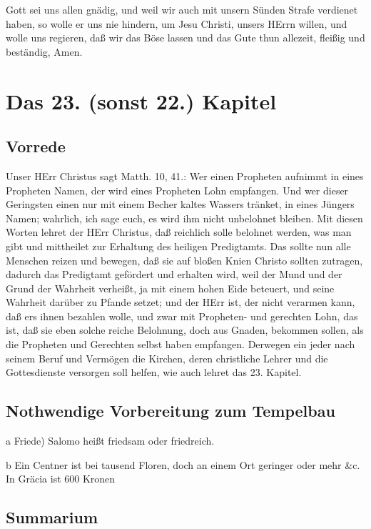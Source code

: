 Gott sei uns allen gnädig, und weil wir auch mit unsern Sünden Strafe verdienet haben, so wolle er uns nie hindern, um Jesu Christi, unsers HErrn willen, und wolle uns regieren, daß wir das Böse lassen und das Gute thun allezeit, fleißig und beständig, Amen.

\chapter{Das 23. (sonst 22.) Kapitel}

\section{Vorrede}

Unser HErr Christus sagt Matth. 10, 41.: Wer einen Propheten aufnimmt in eines Propheten Namen, der wird eines Propheten Lohn empfangen. Und wer dieser Geringsten einen nur mit einem Becher kaltes Wassers tränket, in eines Jüngers Namen; wahrlich, ich sage euch, es wird ihm nicht unbelohnet bleiben. Mit diesen Worten lehret der HErr Christus, daß reichlich solle belohnet werden, was man gibt und mittheilet zur Erhaltung des heiligen Predigtamts. Das sollte nun alle Menschen reizen und bewegen, daß sie auf bloßen Knien Christo sollten zutragen, dadurch das Predigtamt gefördert und erhalten wird, weil der Mund und der Grund der Wahrheit verheißt, ja mit einem hohen Eide beteuert, und seine Wahrheit darüber zu Pfande setzet; und der HErr ist, der nicht verarmen kann, daß ers ihnen bezahlen wolle, und zwar mit Propheten- und gerechten Lohn, das ist, daß sie eben solche reiche Belohnung, doch aus Gnaden, bekommen sollen, als die Propheten und Gerechten selbst haben empfangen. Derwegen ein jeder nach seinem Beruf und Vermögen die Kirchen, deren christliche Lehrer und die Gottesdienste versorgen soll helfen, wie auch lehret das 23. Kapitel.

\section[Nothwendige Vorbereitung zum Tempelbau]{Nothwendige Vorbereitung zum Tempelbau}

a Friede) Salomo heißt friedsam oder friedreich.

b Ein Centner ist bei tausend Floren, doch an einem Ort geringer oder mehr \&c. In Gräcia ist 600 Kronen

\section{Summarium}


